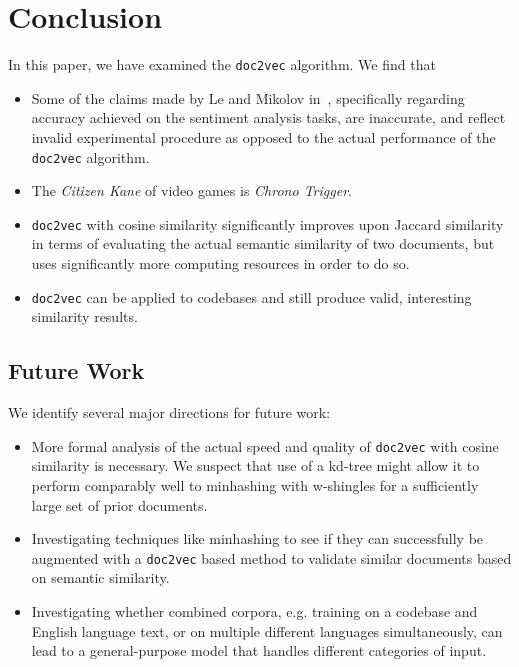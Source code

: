 \documentclass[11pt]{article}
\begin{document}
\section*{Conclusion}
In this paper, we have examined the \texttt{doc2vec} algorithm.
We find that
\begin{itemize}
  \item Some of the claims made by Le and Mikolov
        in~\cite{le2014distributed}, specifically regarding accuracy
        achieved on the sentiment analysis tasks, are inaccurate, and
        reflect invalid experimental procedure as opposed to the actual
        performance of the \texttt{doc2vec} algorithm.
  \item The \emph{Citizen Kane} of video games is \emph{Chrono Trigger}.
  \item \texttt{doc2vec} with cosine similarity significantly improves
        upon Jaccard similarity in terms of evaluating the actual semantic
        similarity of two documents, but uses significantly more computing
        resources in order to do so.
  \item \texttt{doc2vec} can be applied to codebases and still produce valid,
        interesting similarity results.
\end{itemize}

\subsection*{Future Work}
We identify several major directions for future work:
\begin{itemize}
  \item More formal analysis of the actual speed and quality of
        \texttt{doc2vec} with cosine similarity is necessary. We suspect
        that use of a kd-tree might allow it to perform comparably well
        to minhashing with w-shingles for a sufficiently large set of prior
        documents.
  \item Investigating techniques like minhashing to see if they can
        successfully be augmented with a \texttt{doc2vec} based method to
        validate similar documents based on semantic similarity.
  \item Investigating whether combined corpora, e.g. training on a codebase
        and English language text, or on multiple different languages
        simultaneously, can lead to a general-purpose model that handles
        different categories of input.
\end{itemize}

\printbibliography
\end{document}
